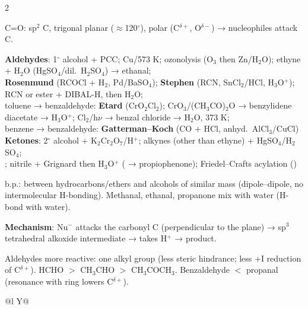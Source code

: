 \documentclass[9pt,a4paper]{extarticle}
\newcommand{\nr}[1]{\textbf{\color{uc!85!black}#1}}
\begin{document}
\begin{multicols}{2}
\begin{fl}
\item C=O: sp$^2$ C, trigonal planar ($\approx$120$^\circ$), polar (C$^{\delta+}$, O$^{\delta-}$) → nucleophiles attack C.
\end{fl}
\begin{kbox}
\textbf{Aldehydes}: 1$^\circ$ alcohol + PCC; Cu/573 K; ozonolysis (O$_3$ then Zn/H$_2$O); ethyne + H$_2$O (HgSO$_4$/dil.\ H$_2$SO$_4$) → ethanal;\\
\nr{Rosenmund} (RCOCl + H$_2$, Pd/BaSO$_4$); \nr{Stephen} (RCN, SnCl$_2$/HCl, H$_3$O$^+$); RCN or ester + DIBAL-H, then H$_2$O;\\
toluene → benzaldehyde: \nr{Etard} (CrO$_2$Cl$_2$); CrO$_3$/(CH$_3$CO)$_2$O → benzylidene diacetate → H$_3$O$^+$; Cl$_2$/h$\nu$ → benzal chloride → H$_2$O, 373 K;\\
benzene → benzaldehyde: \nr{Gatterman--Koch} (CO + HCl, anhyd.\ AlCl$_3$/CuCl)\\[1pt]
\textbf{Ketones}: 2$^\circ$ alcohol + K$_2$Cr$_2$O$_7$/H$^+$; alkynes (other than ethyne) + HgSO$_4$/H$_2$SO$_4$;\\
; nitrile + Grignard then H$_3$O$^+$ ( → propiophenone); Friedel--Crafts acylation ()
\end{kbox}
\begin{fl}
\item b.p.: between hydrocarbons/ethers and alcohols of similar mass (dipole--dipole, no intermolecular H-bonding). Methanal, ethanal, propanone mix with water (H-bond with water).
\end{fl}
\begin{fl}
\item \textbf{Mechanism}: Nu$^-$ attacks the carbonyl C (perpendicular to the plane) → sp$^3$ tetrahedral alkoxide intermediate → takes H$^+$ → product.
\item Aldehydes more reactive: one alkyl group (less steric hindrance; less +I reduction of C$^{\delta+}$). HCHO $>$ CH$_3$CHO $>$ CH$_3$COCH$_3$. Benzaldehyde $<$ propanal (resonance with ring lowers C$^{\delta+}$).
\end{fl}
{\scriptsize\setlength{\tabcolsep}{2pt}
\begin{tabularx}{\linewidth}{@{}l Y@{}}

\end{tabularx}}
\end{multicols}
\end{document}
